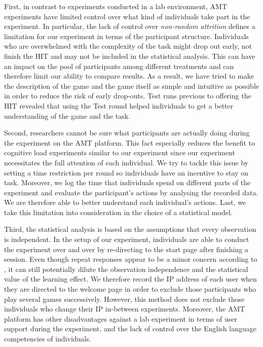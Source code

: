 First, in contrast to experiments conducted in a lab environment, \ac{AMT} experiments have limited control over what kind of individuals take part in the experiment. In particular, the lack of control over \textit{non-random attrition} \citep{Rand2012} defines a limitation for our experiment in terms of the participant structure. Individuals who are overwhelmed with the complexity of the task might drop out early, not finish the \ac{HIT} and may not be included in the statistical analysis. This can have an impact on the pool of participants among different treatments and can therefore limit our ability to compare results. As a result, we have tried to make the description of the game and the game itself as simple and intuitive as possible in order to reduce the risk of early drop-outs. Test runs previous to offering the \ac{HIT} revealed that using the Test round helped individuals to get a better understanding of the game and the task.

Second, researchers cannot be sure what participants are actually doing during the experiment on the \ac{AMT} platform. This fact especially reduces the benefit to cognitive load experiments similar to our experiment since our experiment necessitates the full attention of each individual. We try to tackle this issue by setting a time restriction per round so individuals have an incentive to stay on task. Moreover, we log the time that individuals spend on different parts of the experiment and evaluate the participant's actions by analysing the recorded data. We are therefore able to better understand each individual's actions. Last, we take this limitation into consideration in the choice of a statistical model.

Third, the statistical analysis is based on the assumptions that every observation is independent. In the setup of our experiment, individuals are able to conduct the experiment over and over by re-directing to the start page after finishing a session. Even though repeat responses appear to be a minor concern according to \cite{Berinsky2012}, it can still potentially dilute the observation independence and the statistical value of the learning effect. We therefore record the IP address of each user when they are directed to the welcome page in order to exclude those participants who play several games successively. However, this method does not exclude those individuals who change their IP in-between experiments.
Moreover, the \ac{AMT} platform has other disadvantages against a lab experiment in terms of user support during the experiment, and the lack of control over the English language competencies of individuals. 

